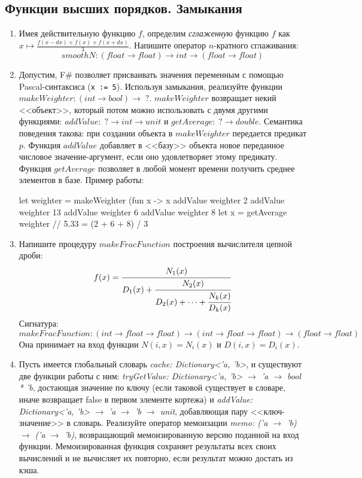 \documentclass[a4paper,11pt]{article}
\newcommand{\<}{\langle}
\renewcommand{\>}{\rangle}
\begin{document}
\subsection*{Функции высших порядков. Замыкания}
\begin{enumerate}
\item Имея действительную функцию $f$, определим \textit{сглаженную} функцию
  $f$ как $x \mapsto \frac{f(x-dx) + f(x) + f(x+dx)}{3}$. Напишите оператор
  $n$-кратного сглаживания:
  $$ smoothN: (float \to float) \to int \to (float \to float) $$

\item Допустим, F\# позволяет присваивать значения переменным с помощью
  Pascal-синтаксиса (\texttt{x := 5}). Используя замыкания, реализуйте
  функции $makeWeighter: (int \to bool) \to \;?$. $makeWeighter$ возвращает
  некий <<объект>>, который потом можно использовать с двумя другими
  функциями: $addValue: \;? \to int \to unit$ и $getAverage: \;? \to double$.
  Семантика поведения такова: при создании объекта в $makeWeighter$
  передается предикат $p$. Функция $addValue$ добавляет в <<базу>> объекта
  новое переданное числовое значение-аргумент, если оно удовлетворяет этому
  предикату. Функция $getAverage$ позволяет в любой момент времени получить
  среднее элементов в базе. Пример работы:
  \begin{fsharp}
    let weighter = makeWeighter (fun x -> x %
    addValue weighter 2
    addValue weighter 13
    addValue weighter 6
    addValue weighter 8
    let x = getAverage weighter // 5.33 = (2 + 6 + 8) / 3
  \end{fsharp}

\item Напишите процедуру $makeFracFunction$ построения вычислителя цепной
  дроби:
  $$f(x) = \cfrac{N_1(x)}{D_1(x) + \cfrac{N_2(x)}{D_2(x) + \cdots + \cfrac{N_k(x)}{D_k(x)}}}
  $$
  Сигнатура:
  $$makeFracFunction: (int \to float \to float) \to (int \to float \to float) \to (float \to float)$$
  Она принимает на вход функции $N(i, x) = N_i(x)$ и $D(i, x) = D_i(x)$.

\item Пусть имеется глобальный словарь \textit{cache: Dictionary<'a, 'b>},
  и существуют две функции работы с ним:
  \textit{tryGetValue: Dictionary<'a, 'b> $\to$ 'a $\to$ bool * 'b}, достающая
  значение по ключу (если таковой существует в словаре, иначе возвращает
  false в первом элементе кортежа) и
  \textit{addValue: Dictionary<'a, 'b> $\to$ 'a $\to$ 'b $\to$ unit},
  добавляющая пару <<ключ-значение>> в словарь. Реализуйте оператор
  мемоизации \textit{memo: ('a $\to$ 'b) $\to$ ('a $\to$ 'b)}, возвращающий
  мемоизированную версию поданной на вход функции. Мемоизированная функция
  сохраняет результаты всех своих вычислений и не вычисляет их повторно,
  если результат можно достать из кэша.
\end{enumerate}
\end{document}
